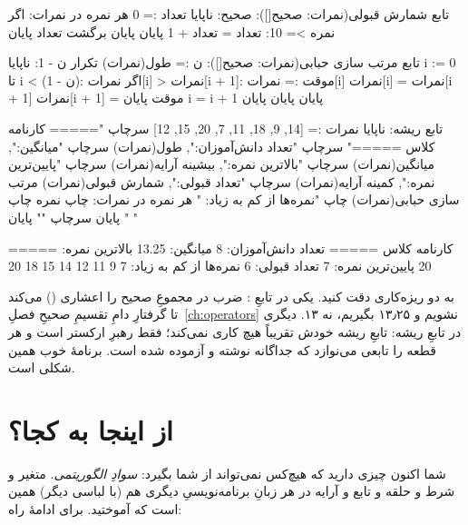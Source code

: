 \begin{salamfa}
تابع شمارش قبولی(نمرات: صحیح[]): صحیح:
    ناپایا تعداد := 0
    هر نمره در نمرات:
        اگر نمره >= 10:
            تعداد = تعداد + 1
        پایان
    پایان
    برگشت تعداد
پایان

تابع مرتب سازی حبابی(نمرات: صحیح[]):
    ن := طول(نمرات)
    تکرار ن - 1:
        ناپایا i := 0
        تا i < (ن - 1):
            اگر نمرات[i] > نمرات[i + 1]:
                موقت := نمرات[i]
                نمرات[i] = نمرات[i + 1]
                نمرات[i + 1] = موقت
            پایان
            i = i + 1
        پایان
    پایان
پایان
\end{salamfa}

\begin{salamfa}
تابع ریشه:
    ناپایا نمرات := [14, 9, 18, 11, 7, 20, 15, 12]
    سرچاپ "===== کارنامه کلاس ====="
    سرچاپ "تعداد دانش‌آموزان:", طول(نمرات)
    سرچاپ "میانگین:", میانگین(نمرات)
    سرچاپ "بالاترین نمره:", بیشینه آرایه(نمرات)
    سرچاپ "پایین‌ترین نمره:", کمینه آرایه(نمرات)
    سرچاپ "تعداد قبولی:", شمارش قبولی(نمرات)
    مرتب سازی حبابی(نمرات)
    چاپ "نمره‌ها از کم به زیاد: "
    هر نمره در نمرات:
        چاپ نمره
        چاپ " "
    پایان
    سرچاپ ""
پایان
\end{salamfa}

\begin{progoutfa}
===== کارنامه کلاس =====
تعداد دانش‌آموزان: 8
میانگین: 13.25
بالاترین نمره: 20
پایین‌ترین نمره: 7
تعداد قبولی: 6
نمره‌ها از کم به زیاد: 7 9 11 12 14 15 18 20
\end{progoutfa}

به دو ریزه‌کاری دقت کنید. یکی در تابعِ : ضرب در 
مجموعِ صحیح را اعشاری () می‌کند تا گرفتارِ دامِ تقسیمِ صحیحِ فصلِ~\ref{ch:operators} نشویم و ۱۳٫۲۵ بگیریم، نه ۱۳. دیگری در تابعِ ریشه:
تابعِ ریشه خودش تقریباً هیچ کاری نمی‌کند؛ فقط رهبرِ ارکستر است و هر قطعه
را تابعی می‌نوازد که جداگانه نوشته و آزموده شده است. برنامهٔ خوب همین
شکلی است.

\section{از اینجا به کجا؟}

شما اکنون چیزی دارید که هیچ‌کس نمی‌تواند از شما بگیرد: \emph{سوادِ
الگوریتمی}. متغیر و شرط و حلقه و تابع و آرایه در هر زبانِ برنامه‌نویسیِ
دیگری هم (با لباسی دیگر) همین است که آموختید. برای ادامهٔ راه:

